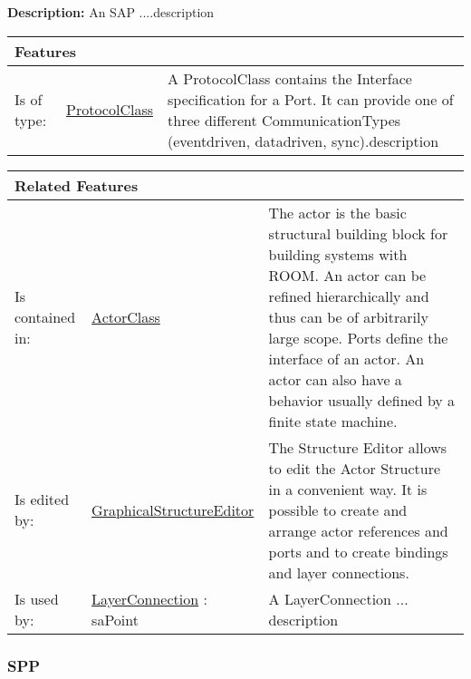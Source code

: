 			\textbf{Description:} An SAP ....description 
			
			
			\begingroup
			\renewcommand{\arraystretch}{1.8} %
			\begin{longtable}{p{2.5cm}|p{4cm} p{}}
				\multicolumn{2}{l}{\textbf{\large Features}} & \\
				\hline
			Is of type: & \tabitem \hyperlink{ref:ProtocolClass}{ProtocolClass}  & A ProtocolClass contains the Interface specification for a Port. It can provide one of three different CommunicationTypes (eventdriven, datadriven, sync).description \\
			\hline
			\end{longtable}
			\endgroup
			
			\begingroup
			\renewcommand{\arraystretch}{1.8} %
			\begin{longtable}{p{2.5cm}|p{4cm} p{}}
				\multicolumn{2}{l}{\textbf{\large Related Features}} & \\
				\hline
			Is contained in: & \tabitem \hyperlink{ref:ActorClass}{ActorClass}  & The actor is the basic structural building block for building systems with ROOM. An actor can be refined hierarchically and thus can be of arbitrarily large scope. Ports define the interface of an actor. An actor can also have a behavior usually defined by a finite state machine. \\
			\hline
			Is edited by: & \tabitem \hyperlink{ref:GraphicalStructureEditor}{GraphicalStructureEditor}  & The Structure Editor allows to edit the Actor Structure in a convenient way. It is possible to create and arrange actor references and ports and to create bindings and layer connections.\\
			\hline
			Is used by: & \tabitem \hyperlink{ref:LayerConnection}{LayerConnection} : saPoint & A LayerConnection ... description \\
			\hline
			\end{longtable}
			\endgroup
			
			
			
		\vspace{\baselineskip}
		\vspace{\baselineskip}
		\vspace{\baselineskip}
		
		\subsubsection{\huge SPP}
			\hypertarget{ref:SPP}{}
			
